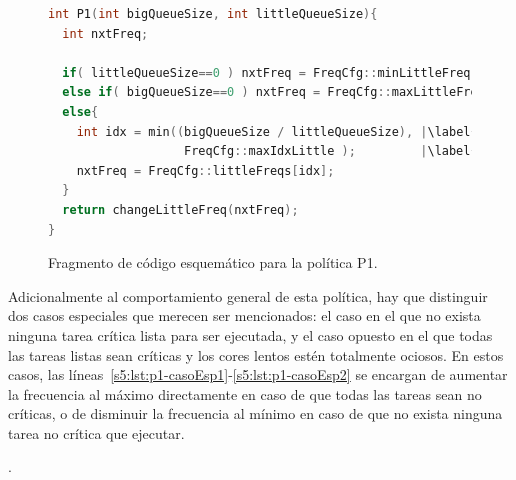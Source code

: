 \begin{figure}
  \centering

  \begin{lstlisting}[language=C++]
int P1(int bigQueueSize, int littleQueueSize){
  int nxtFreq;
      
  if( littleQueueSize==0 ) nxtFreq = FreqCfg::minLittleFreq; |\label{s5:lst:p1-casoEsp1}|
  else if( bigQueueSize==0 ) nxtFreq = FreqCfg::maxLittleFreq; |\label{s5:lst:p1-casoEsp2}|
  else{
    int idx = min((bigQueueSize / littleQueueSize), |\label{s5:lst:p1-calculoPrincipal(a)}|
                   FreqCfg::maxIdxLittle );         |\label{s5:lst:p1-calculoPrincipal(b)}|
    nxtFreq = FreqCfg::littleFreqs[idx];
  }
  return changeLittleFreq(nxtFreq);
}
\end{lstlisting}

  \caption[Fragmento de código esquemático para la política P1]
  {Fragmento de código esquemático para la política P1.}
  \label{s5:fig:listing-p1}
\end{figure}

Adicionalmente al comportamiento general de esta política, hay que
distinguir dos casos especiales que merecen ser mencionados: el caso en el
que no exista ninguna tarea crítica lista para ser ejecutada, y el caso
opuesto en el que todas las tareas listas sean críticas y los cores lentos
estén totalmente ociosos. En estos casos, las
líneas~\ref{s5:lst:p1-casoEsp1}-\ref{s5:lst:p1-casoEsp2} se encargan de
aumentar la frecuencia al máximo directamente en caso de que todas las
tareas sean no críticas, o de disminuir la frecuencia al mínimo en caso de
que no exista ninguna tarea no crítica que ejecutar.

.

